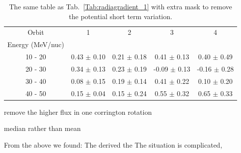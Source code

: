 \begin{table}[!htb]
    \centering

    \begin{tabular}{|c|c|c|c|c|}
        \hline
    Orbit   & 1                 & 2              & 3               & 4 \\
    Energy (MeV/nuc)  &         &                &                 & \\  
    \hline
    10 - 20 &  0.43 $\pm$ 0.10 & 0.21 $\pm$ 0.18 & 0.41 $\pm$ 0.13 & 0.40 $\pm$ 0.49 \\
    \hline
    20 - 30 &  0.34 $\pm$ 0.13 & 0.23 $\pm$ 0.19 & -0.09 $\pm$ 0.13 & -0.16 $\pm$ 0.28 \\
    \hline
    30 - 40 &  0.08 $\pm$ 0.15 & 0.19 $\pm$ 0.14 & 0.41 $\pm$ 0.22 & 0.10 $\pm$ 0.20 \\
    \hline
    40 - 50 &  0.15 $\pm$ 0.04 & 0.15 $\pm$ 0.24 & 0.55 $\pm$ 0.32 & 0.65 $\pm$ 0.33 \\
    \hline
    \end{tabular}
    \caption[Table of helium radial gradient with extra mask]{The same table as Tab.~\ref{Tab:radiagradient_1} with extra mask to remove the potential short term variation. }
    \label{Tab:radiagradient_2}
\end{table}

remove the higher flux in one corrington rotation

median rather than mean

From the above we found:
The derived the 
The situation is complicated, 






%
